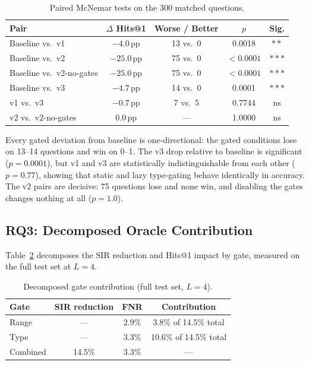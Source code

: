 \begin{table}[htpb]
  \centering
  \caption{Paired McNemar tests on the 300 matched questions.}
  \label{tab:significance}
  \begin{tabular}{@{}lcccc@{}}
    \toprule
    Pair & $\Delta$ Hits@1 & Worse / Better & $p$ & Sig. \\
    \midrule
    Baseline vs.\ v1        & $-4.0$\,pp & 13 vs.\ 0 & 0.0018 & $**$ \\
    Baseline vs.\ v2        & $-25.0$\,pp & 75 vs.\ 0 & $<0.0001$ & $***$ \\
    Baseline vs.\ v2-no-gates & $-25.0$\,pp & 75 vs.\ 0 & $<0.0001$ & $***$ \\
    Baseline vs.\ v3        & $-4.7$\,pp & 14 vs.\ 0 & 0.0001 & $***$ \\
    v1 vs.\ v3              & $-0.7$\,pp & 7 vs.\ 5 & 0.7744 & ns \\
    v2 vs.\ v2-no-gates     & $0.0$\,pp & --- & 1.0000 & ns \\
    \bottomrule
  \end{tabular}
\end{table}

Every gated deviation from baseline is one-directional: the gated conditions lose on
13--14 questions and win on 0--1. The v3 drop relative to baseline is significant
($p = 0.0001$), but v1 and v3 are statistically indistinguishable from each other
($p = 0.77$), showing that static and lazy type-gating behave identically in
accuracy. The v2 pairs are decisive: 75 questions lose and none win, and disabling the
gates changes nothing at all ($p = 1.0$).

\subsection{RQ3: Decomposed Oracle Contribution}
\label{sec:rq3}

Table~\ref{tab:rq3} decomposes the SIR reduction and Hits@1 impact by gate, measured
on the full test set at $L{=}4$.

\begin{table}[htpb]
  \centering
  \caption{Decomposed gate contribution (full test set, $L{=}4$).}
  \label{tab:rq3}
  \begin{tabular}{@{}lccc@{}}
    \toprule
    Gate     & SIR reduction & FNR  & Contribution \\
    \midrule
    Range    & ---           & 2.9\% & 3.8\% of 14.5\% total \\
    Type     & ---           & 3.3\% & 10.6\% of 14.5\% total \\
    Combined & 14.5\%        & 3.3\% & ---                   \\
    \bottomrule
  \end{tabular}
\end{table}

